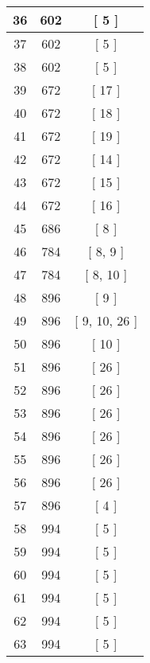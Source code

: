 \begin{center}
\begin{longtable}[H]{|| c c c ||}
36 & 602 & [ 5 ] \\ 
\hline
37 & 602 & [ 5 ] \\ 
\hline
38 & 602 & [ 5 ] \\ 
\hline
39 & 672 & [ 17 ] \\ 
\hline
40 & 672 & [ 18 ] \\ 
\hline
41 & 672 & [ 19 ] \\ 
\hline
42 & 672 & [ 14 ] \\ 
\hline
43 & 672 & [ 15 ] \\ 
\hline
44 & 672 & [ 16 ] \\ 
\hline
45 & 686 & [ 8 ] \\ 
\hline
46 & 784 & [ 8, 9 ] \\ 
\hline
47 & 784 & [ 8, 10 ] \\ 
\hline
48 & 896 & [ 9 ] \\ 
\hline
49 & 896 & [ 9, 10, 26 ] \\ 
\hline
50 & 896 & [ 10 ] \\ 
\hline
51 & 896 & [ 26 ] \\ 
\hline
52 & 896 & [ 26 ] \\ 
\hline
53 & 896 & [ 26 ] \\ 
\hline
54 & 896 & [ 26 ] \\ 
\hline
55 & 896 & [ 26 ] \\ 
\hline
56 & 896 & [ 26 ] \\ 
\hline
57 & 896 & [ 4 ] \\ 
\hline
58 & 994 & [ 5 ] \\ 
\hline
59 & 994 & [ 5 ] \\ 
\hline
60 & 994 & [ 5 ] \\ 
\hline
61 & 994 & [ 5 ] \\ 
\hline
62 & 994 & [ 5 ] \\ 
\hline
63 & 994 & [ 5 ] \\ 
\hline
\end{longtable}
\end{center}
